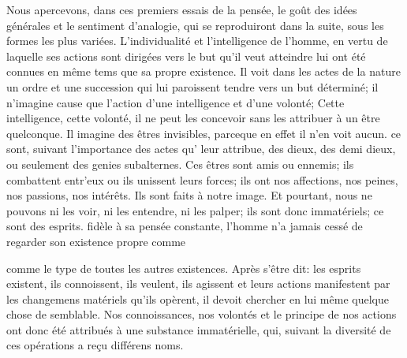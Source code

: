 \documentclass[11pt,a4paper]{article}
\begin{document}
Nous apercevons, dans ces premiers essais de la pensée, le goût des
idées générales et le sentiment d'analogie, qui se reproduiront dans la
suite, sous les formes les plus variées. L'individualité et
l'intelligence de l'homme, en vertu de laquelle ses actions sont
dirigées vers le but qu'il veut atteindre lui ont été connues en même
tems que sa propre existence.
Il voit dans les actes de la nature un ordre et une succession qui lui
paroissent tendre vers un but déterminé; il  n'imagine
 cause que l'action d'une intelligence et d'une
volonté;  Cette intelligence, cette volonté, il ne peut les
concevoir sans les attribuer à un être quelconque. Il imagine des êtres
invisibles, parceque en effet il n'en voit aucun. ce sont, suivant
l'importance des actes qu' leur attribue, des dieux, des
demi dieux, ou seulement des genies subalternes. Ces êtres sont amis ou
ennemis; ils combattent entr'eux ou ils unissent leurs forces; ils ont
nos affections, nos peines, nos passions, nos intérêts. Ils sont faits
à notre image. Et pourtant, nous ne pouvons ni les voir, ni les
entendre, ni les palper; ils sont donc immatériels; ce sont des
esprits.  fidèle à sa pensée constante, l'homme n'a
jamais cessé de regarder  son existence propre comme

comme le type de toutes les autres existences. Après s'être dit: les
esprits existent, ils connoissent, ils veulent, ils agissent
 et leurs actions 
manifestent par les changemens matériels qu'ils opèrent, il
 devoit  chercher en
lui même quelque chose de semblable. Nos connoissances, nos volontés et
le principe de nos actions ont donc été attribués à une substance
immatérielle, qui, suivant la diversité  de ces
opérations a reçu  différens noms.
\end{document}
